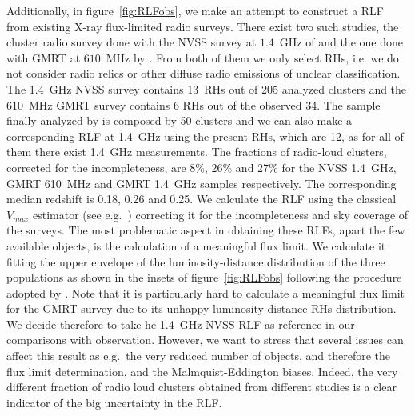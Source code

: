 \documentclass[traditabstract]{aa}
\begin{document}
\begin{appendix}
Additionally, in figure~\ref{fig:RLFobs}, we make an attempt to construct a RLF from existing X-ray flux-limited radio surveys. There exist two such studies, the cluster radio survey done with the NVSS survey at $1.4$~GHz of \cite{1999NewA....4..141G} and the one done with GMRT at $610$~MHz by \cite{VenturiGMRT_1,VenturiGMRT_2}. From both of them we only select RHs, i.e. we do not consider radio relics or other diffuse radio emissions of unclear classification. The 1.4~GHz NVSS survey contains 13~RHs out of 205 analyzed clusters and the 610~MHz GMRT survey contains 6 RHs out of the observed 34. The sample finally analyzed by \cite{VenturiGMRT_1,VenturiGMRT_2} is composed by 50 clusters and we can also make a corresponding RLF at 1.4~GHz using the present RHs, which are 12, as for all of them there exist 1.4~GHz measurements. The fractions of radio-loud clusters, corrected for the incompleteness, are 8\%, 26\% and 27\% for the NVSS 1.4~GHz, GMRT 610~MHz and GMRT 1.4~GHz samples respectively. The corresponding median redshift is 0.18, 0.26 and 0.25. We calculate the RLF using the classical $V_{max}$ estimator (see e.g.~\citealp{1976ApJ...207..700F}) correcting it for the incompleteness and sky coverage of the surveys. The most problematic aspect in obtaining these RLFs, apart the few available objects, is the calculation of a meaningful flux limit. We calculate it fitting the upper envelope of the luminosity-distance distribution of the three populations as shown in the insets of figure~\ref{fig:RLFobs} following the procedure adopted by \cite{2011arXiv1106.5494B}. Note that it is particularly hard to calculate a meaningful flux limit for the GMRT survey due to its unhappy luminosity-distance RHs distribution. We decide therefore to take he 1.4~GHz NVSS RLF as reference in our comparisons with observation. However, we want to stress that several issues can affect this result as e.g.~the very reduced number of objects, and therefore the flux limit determination, and the Malmquist-Eddington biases. Indeed, the very different fraction of radio loud clusters obtained from different studies is a clear indicator of the big uncertainty in the RLF.


\end{appendix}
\end{document}
